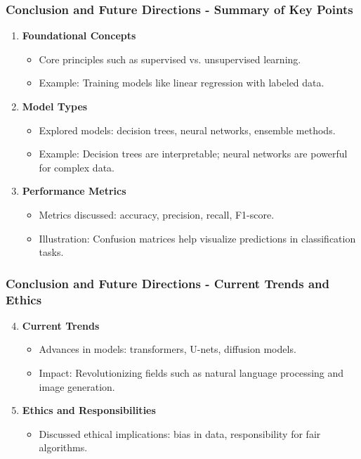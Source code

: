 \documentclass[aspectratio=169]{beamer}
\begin{document}
\begin{frame}[fragile]
    \frametitle{Conclusion and Future Directions - Summary of Key Points}
    \begin{enumerate}
        \item \textbf{Foundational Concepts}
            \begin{itemize}
                \item Core principles such as supervised vs. unsupervised learning.
                \item Example: Training models like linear regression with labeled data.
            \end{itemize}
        \item \textbf{Model Types}
            \begin{itemize}
                \item Explored models: decision trees, neural networks, ensemble methods.
                \item Example: Decision trees are interpretable; neural networks are powerful for complex data.
            \end{itemize}
        \item \textbf{Performance Metrics}
            \begin{itemize}
                \item Metrics discussed: accuracy, precision, recall, F1-score.
                \item Illustration: Confusion matrices help visualize predictions in classification tasks.
            \end{itemize}
    \end{enumerate}
\end{frame}

\begin{frame}[fragile]
    \frametitle{Conclusion and Future Directions - Current Trends and Ethics}
    \begin{enumerate}
        \setcounter{enumi}{3}
        \item \textbf{Current Trends}
            \begin{itemize}
                \item Advances in models: transformers, U-nets, diffusion models.
                \item Impact: Revolutionizing fields such as natural language processing and image generation.
            \end{itemize}
        \item \textbf{Ethics and Responsibilities}
            \begin{itemize}
                \item Discussed ethical implications: bias in data, responsibility for fair algorithms.
            \end{itemize}
    \end{enumerate}
\end{frame}
\end{document}
